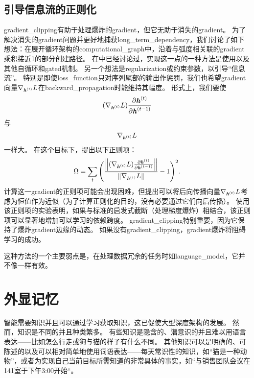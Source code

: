 \subsection{引导信息流的正则化}
\label{sec:regularizing_to_encourage_information_flow}
\gls{gradient_clipping}有助于处理爆炸的\gls{gradient}，但它无助于消失的\gls{gradient}。
为了解决消失的\gls{gradient}问题并更好地捕获\gls{long_term_dependency}，我们讨论了如下想法：在展开循环架构的\gls{computational_graph}中，沿着与弧度相关联的\gls{gradient}乘积接近1的部分创建路径。
在中已经讨论过，实现这一点的一种方法是使用以及其他自循环和\gls{gated}机制。
另一个想法是\gls{regularization}或约束参数，以引导``信息流''。
特别是即使\gls{loss_function}只对序列尾部的输出作惩罚，我们也希望\gls{gradient}向量$\nabla_{\boldsymbol{\mathit{h}}^{(t)}} L$在\gls{backward_propagation}时能维持其幅度。
形式上，我们要使
\begin{align}
 (\nabla_{\boldsymbol{\mathit{h}}^{(t)}} L) \frac{\partial \boldsymbol{\mathit{h}}^{(t)}}{\partial \boldsymbol{\mathit{h}}^{(t-1)}}
\end{align}
与
\begin{align}
\nabla_{\boldsymbol{\mathit{h}}^{(t)}} L 
\end{align}
一样大。
在这个目标下，\citet{Pascanu+al-ICML2013-small}提出以下正则项：
\begin{align}
 \Omega = \sum_t \Bigg(  \frac{
 \left\lVert (\nabla_{\boldsymbol{\mathit{h}}^{(t)}} L) \frac{\partial \boldsymbol{\mathit{h}}^{(t)}}{\partial \boldsymbol{\mathit{h}}^{(t-1)}}\right\rVert}
 {\left\lVert\nabla_{\boldsymbol{\mathit{h}}^{(t)}} L\right\rVert} -1 \Bigg)^2.
\end{align}
计算这一\gls{gradient}的正则项可能会出现困难，但\cite{Pascanu+al-ICML2013-small}提出可以将后向传播向量$\nabla_{\boldsymbol{\mathit{h}}^{(t)}} L$考虑为恒值作为近似（为了计算正则化的目的，没有必要通过它们向后传播）。
使用该正则项的实验表明，如果与标准的启发式截断（处理梯度爆炸）相结合，该正则项可以显著地增加可以学习的依赖跨度。
\gls{gradient_clipping}特别重要，因为它保持了爆炸\gls{gradient}边缘的动态。
如果没有\gls{gradient_clipping}，\gls{gradient}爆炸将阻碍学习的成功。

这种方法的一个主要弱点是，在处理数据冗余的任务时如\gls{language_model}，它并不像一样有效。


\section{外显记忆}
\label{sec:explicit_memory}
智能需要知识并且可以通过学习获取知识，这已促使大型深度架构的发展。
然而，知识是不同的并且种类繁多。
有些知识是隐含的、潜意识的并且难以用语言表达——比如怎么行走或狗与猫的样子有什么不同。
其他知识可以是明确的、可陈述的以及可以相对简单地使用词语表达——每天常识性的知识，如``猫是一种动物''，或者为实现自己当前目标所需知道的非常具体的事实，如``与销售团队会议在141室于下午3:00开始``。


